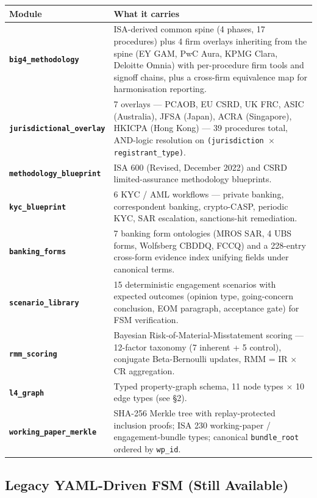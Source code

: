 \documentclass[11pt,a4paper]{article}
\begin{document}
\renewcommand{\arraystretch}{1.25}
\begin{tabularx}{\textwidth}{@{}>{\bfseries\color{brand}}l X@{}}
\toprule
\textbf{Module} & \textbf{What it carries} \\
\midrule
\texttt{big4\_methodology} &
  ISA-derived common spine (4 phases, 17 procedures) plus 4 firm overlays
  inheriting from the spine (EY GAM, PwC Aura, KPMG Clara, Deloitte Omnia)
  with per-procedure firm tools and signoff chains, plus a cross-firm
  equivalence map for harmonisation reporting. \\
\texttt{jurisdictional\_overlay} &
  7 overlays --- PCAOB, EU CSRD, UK FRC, ASIC (Australia), JFSA (Japan),
  ACRA (Singapore), HKICPA (Hong Kong) --- 39 procedures total, AND-logic
  resolution on \texttt{(jurisdiction $\times$ registrant\_type)}. \\
\texttt{methodology\_blueprint} &
  ISA 600 (Revised, December 2022) and CSRD limited-assurance methodology
  blueprints. \\
\texttt{kyc\_blueprint} &
  6 KYC / AML workflows --- private banking, correspondent banking,
  crypto-CASP, periodic KYC, SAR escalation, sanctions-hit remediation. \\
\texttt{banking\_forms} &
  7 banking form ontologies (MROS SAR, 4 UBS forms, Wolfsberg CBDDQ, FCCQ)
  and a 228-entry cross-form evidence index unifying fields under canonical
  terms. \\
\texttt{scenario\_library} &
  15 deterministic engagement scenarios with expected outcomes (opinion
  type, going-concern conclusion, EOM paragraph, acceptance gate) for
  FSM verification. \\
\texttt{rmm\_scoring} &
  Bayesian Risk-of-Material-Misstatement scoring --- 12-factor taxonomy
  (7 inherent + 5 control), conjugate Beta-Bernoulli updates,
  RMM = IR $\times$ CR aggregation. \\
\texttt{l4\_graph} &
  Typed property-graph schema, 11 node types $\times$ 10 edge types
  (see \S{}2). \\
\texttt{working\_paper\_merkle} &
  SHA-256 Merkle tree with replay-protected inclusion proofs;
  ISA 230 working-paper / engagement-bundle types; canonical
  \texttt{bundle\_root} ordered by \texttt{wp\_id}. \\
\bottomrule
\end{tabularx}

\subsection{Legacy YAML-Driven FSM (Still Available)}
\end{document}
